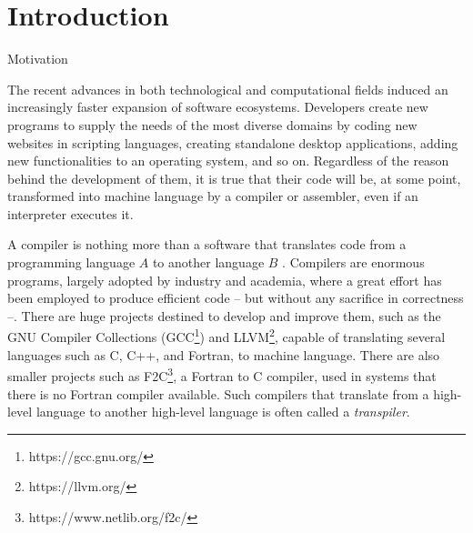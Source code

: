 \chapter{Introduction}
\label{cap:introducao}

\begin{section}{Motivation}\label{sec:motivation}

The recent advances in both technological and computational fields induced an
increasingly faster expansion of software ecosystems. Developers create new
programs to supply the needs of the most diverse domains by coding new websites
in scripting languages, creating standalone desktop applications, adding new
functionalities to an operating system, and so on. Regardless of the reason
behind the development of them, it is true that their code will be, at some
point, transformed into machine language by a compiler or assembler, even if an
interpreter executes it.



A compiler is nothing more than a software that translates code from a
programming language $A$ to another language $B$ \citep{dragonbook}.  Compilers
are enormous programs, largely adopted by industry and academia, where a great
effort has been employed to produce efficient code -- but without any sacrifice
in correctness --. There are huge projects destined to develop and improve
them, such as the GNU Compiler Collections (GCC\footnote{https://gcc.gnu.org/})
and LLVM\footnote{https://llvm.org/}, capable of translating several languages
such as C, C++, and Fortran, to machine language. There are also smaller
projects such as F2C\footnote{https://www.netlib.org/f2c/}, a Fortran to C
compiler, used in systems that there is no Fortran compiler available. Such
compilers that translate from a high-level language to another high-level
language is often called a \textit{transpiler}.


\end{section}
